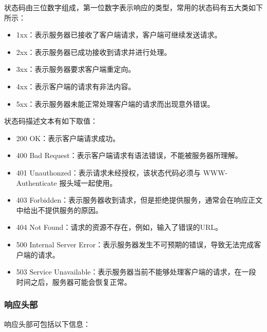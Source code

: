 \documentclass[bachelor]{thesis-uestc}
\begin{document}
状态码由三位数字组成，第一位数字表示响应的类型，常用的状态码有五大类如下所示：
\begin{itemize}
	\item 1xx：表示服务器已接收了客户端请求，客户端可继续发送请求。
	\item 2xx：表示服务器已成功接收到请求并进行处理。
	\item 3xx：表示服务器要求客户端重定向。
	\item 4xx：表示客户端的请求有非法内容。
	\item 5xx：表示服务器未能正常处理客户端的请求而出现意外错误。
\end{itemize}

状态码描述文本有如下取值：

\begin{itemize}
	\item 200 OK：表示客户端请求成功。
	\item 400 Bad Request：表示客户端请求有语法错误，不能被服务器所理解。
	\item 401 Unauthonzed：表示请求未经授权，该状态代码必须与 WWW-Authenticate 报头域一起使用。
	\item 403 Forbidden：表示服务器收到请求，但是拒绝提供服务，通常会在响应正文中给出不提供服务的原因。
	\item 404 Not Found：请求的资源不存在，例如，输入了错误的URL。
	\item 500 Internal Server Error：表示服务器发生不可预期的错误，导致无法完成客户端的请求。
	\item 503 Service Unavailable：表示服务器当前不能够处理客户端的请求，在一段时间之后，服务器可能会恢复正常。
\end{itemize}

\subsubsection*{响应头部}

响应头部可包括以下信息：
\end{document}
